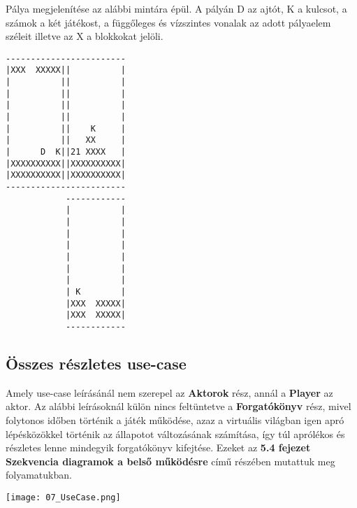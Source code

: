 Pálya megjelenítése az alábbi mintára épül. A pályán D az ajtót, K a kulcsot, a számok a két játékost, a függőleges és vízszintes vonalak az adott pályaelem széleit illetve az X a blokkokat jelöli.

\begin{verbatim}
------------------------
|XXX  XXXXX||          |
|          ||          |
|          ||          |
|          ||          |
|          ||          |
|          ||    K     |
|          ||   XX     |
|      D  K||21 XXXX   |
|XXXXXXXXXX||XXXXXXXXXX|
|XXXXXXXXXX||XXXXXXXXXX|
------------------------
            ------------
            |          |
            |          |
            |          |
            |          |
            |          |
            |          |
            |          |
            | K        |
            |XXX  XXXXX|
            |XXX  XXXXX|
            ------------
\end{verbatim}


\subsection{Összes részletes use-case}
Amely use-case leírásánál nem szerepel az \textbf{Aktorok} rész, annál a \textbf{Player} az aktor. Az alábbi leírásoknál külön nincs feltüntetve a \textbf{Forgatókönyv} rész, mivel folytonos időben történik a játék működése, azaz a virtuális világban igen apró lépésközökkel történik az állapotot változásának számítása, így túl aprólékos és részletes lenne mindegyik forgatókönyv kifejtése. Ezeket az \textbf{5.4 fejezet Szekvencia diagramok a belső működésre} című részében mutattuk meg folyamatukban.

\begin{center}
\texttt{[image: 07\_UseCase.png]}
\end{center}

\begin{usecase}
\end{usecase}
\begin{usecase}
\end{usecase}
\begin{usecase}
\end{usecase}

